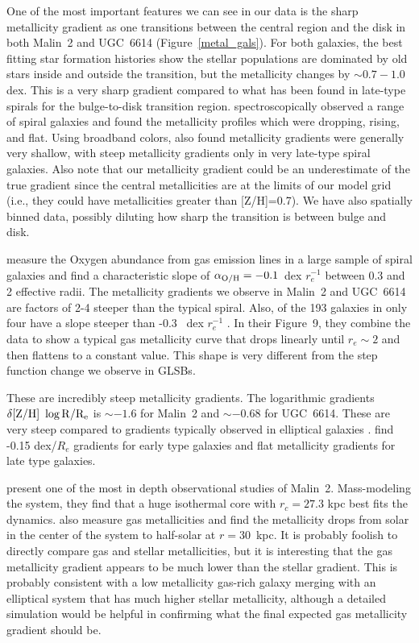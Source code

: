 \documentclass[12pt,preprint]{aastex}
\begin{document}
One of the most important features we can see in our data is the sharp metallicity gradient as one transitions between the central region and the disk in both Malin~2 and UGC~6614 (Figure~\ref{metal_gals}).
For both galaxies, the best fitting star formation histories show the stellar populations are dominated by old stars inside and outside the transition, but the metallicity changes by $\sim0.7-1.0$ dex.
This is a very sharp gradient compared to what has been found in late-type spirals for the bulge-to-disk transition region.
\citet{MacArthur09} spectroscopically observed a range of spiral galaxies and found the metallicity profiles which were dropping, rising, and flat.
Using broadband colors, \citet{MacArthur04} also found metallicity gradients were generally very shallow, with steep metallicity gradients only in very late-type spiral galaxies. Also note that our metallicity gradient could be an underestimate of the true gradient since the central metallicities are at the limits of our model grid (i.e., they could have metallicities greater than [Z/H]=0.7). We have also spatially binned data, possibly diluting how sharp the transition is between bulge and disk.

\citet{Sanchez14} measure the Oxygen abundance from gas emission lines in a large sample of spiral galaxies and find a characteristic slope of $\alpha_{\rm{O/H}} = -0.1$\ dex $r_e^{-1}$ between 0.3 and 2 effective radii.
The metallicity gradients we observe in Malin~2 and UGC~6614 are factors of 2-4 steeper than the typical spiral. Also, of the 193 galaxies in \citet{Sanchez14} only four have a slope steeper than -0.3 \ dex $r_e^{-1}$ \citep[Figure~6]{Sanchez14}.
In their Figure~9, they combine the data to show a typical gas metallicity curve that drops linearly until $r_e\sim2$ and then flattens to a constant value.
This shape is very different from the step function change we observe in GLSBs.


These are incredibly steep metallicity gradients.
The logarithmic gradients $\delta \rm{[Z/H]}\ \log{R/R_e}$ is $\sim -1.6$ for Malin~2 and $\sim -0.68$ for UGC~6614.
These are very steep compared to gradients typically observed in elliptical galaxies \citep{Kuntschner10, Greene12, Greene15}.
\citet{Wilkinson15} find -0.15 dex/$R_e$ gradients for early type galaxies and flat metallicity gradients for late type galaxies. 


\citet{Kasparova14} present one of the most in depth observational studies of Malin~2.
Mass-modeling the system, they find that a huge isothermal core with $r_c=27.3$ kpc best fits the dynamics.
\citet{Kasparova14} also measure gas metallicities and find the metallicity drops from solar in the center of the system to half-solar at $r=30$\ kpc.
It is probably foolish to directly compare gas and stellar metallicities, but it is interesting that the gas metallicity gradient appears to be much lower than the stellar gradient.
This is probably consistent with a low metallicity gas-rich galaxy merging with an elliptical system that has much higher stellar metallicity, although a detailed simulation would be helpful in confirming what the final expected gas metallicity gradient should be.
\end{document}
